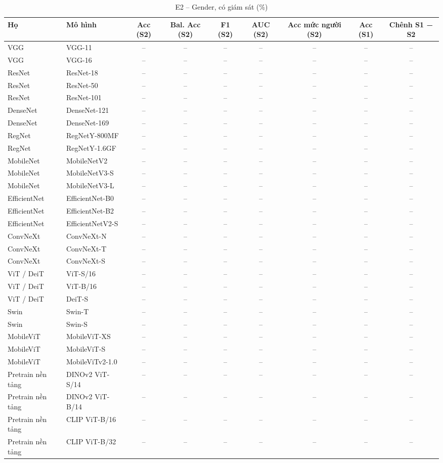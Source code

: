 \begin{table}[t]
\centering
\small
\caption{E2 – Gender, có giám sát (\%)}
\begin{tabular}{llccccccc}
\toprule
Họ & Mô hình & Acc (S2) & Bal. Acc (S2) & F1 (S2) & AUC (S2) & Acc mức người (S2) & Acc (S1) & Chênh S1 − S2 \\
\midrule
VGG & VGG-11 & – & – & – & – & – & – & – \\
VGG & VGG-16 & – & – & – & – & – & – & – \\
ResNet & ResNet-18 & – & – & – & – & – & – & – \\
ResNet & ResNet-50 & – & – & – & – & – & – & – \\
ResNet & ResNet-101 & – & – & – & – & – & – & – \\
DenseNet & DenseNet-121 & – & – & – & – & – & – & – \\
DenseNet & DenseNet-169 & – & – & – & – & – & – & – \\
RegNet & RegNetY-800MF & – & – & – & – & – & – & – \\
RegNet & RegNetY-1.6GF & – & – & – & – & – & – & – \\
MobileNet & MobileNetV2 & – & – & – & – & – & – & – \\
MobileNet & MobileNetV3-S & – & – & – & – & – & – & – \\
MobileNet & MobileNetV3-L & – & – & – & – & – & – & – \\
EfficientNet & EfficientNet-B0 & – & – & – & – & – & – & – \\
EfficientNet & EfficientNet-B2 & – & – & – & – & – & – & – \\
EfficientNet & EfficientNetV2-S & – & – & – & – & – & – & – \\
ConvNeXt & ConvNeXt-N & – & – & – & – & – & – & – \\
ConvNeXt & ConvNeXt-T & – & – & – & – & – & – & – \\
ConvNeXt & ConvNeXt-S & – & – & – & – & – & – & – \\
ViT / DeiT & ViT-S/16 & – & – & – & – & – & – & – \\
ViT / DeiT & ViT-B/16 & – & – & – & – & – & – & – \\
ViT / DeiT & DeiT-S & – & – & – & – & – & – & – \\
Swin & Swin-T & – & – & – & – & – & – & – \\
Swin & Swin-S & – & – & – & – & – & – & – \\
MobileViT & MobileViT-XS & – & – & – & – & – & – & – \\
MobileViT & MobileViT-S & – & – & – & – & – & – & – \\
MobileViT & MobileViTv2-1.0 & – & – & – & – & – & – & – \\
Pretrain nền tảng & DINOv2 ViT-S/14 & – & – & – & – & – & – & – \\
Pretrain nền tảng & DINOv2 ViT-B/14 & – & – & – & – & – & – & – \\
Pretrain nền tảng & CLIP ViT-B/16 & – & – & – & – & – & – & – \\
Pretrain nền tảng & CLIP ViT-B/32 & – & – & – & – & – & – & – \\
\bottomrule
\end{tabular}
\end{table}
